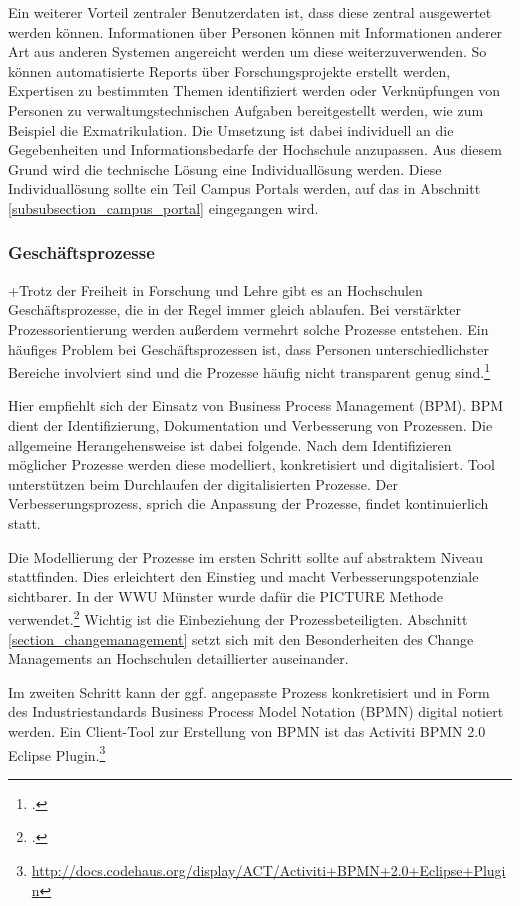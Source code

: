 Ein weiterer Vorteil zentraler Benutzerdaten ist, dass diese zentral ausgewertet werden können. Informationen über Personen können mit Informationen anderer Art aus anderen Systemen angereicht werden um diese weiterzuverwenden. So können automatisierte Reports über Forschungsprojekte erstellt werden, Expertisen zu bestimmten Themen identifiziert werden oder Verknüpfungen von Personen zu verwaltungstechnischen Aufgaben bereitgestellt werden, wie zum Beispiel die Exmatrikulation. Die Umsetzung ist dabei individuell an die Gegebenheiten und Informationsbedarfe der Hochschule anzupassen. Aus diesem Grund wird die technische Lösung eine Individuallösung werden. Diese Individuallösung sollte ein Teil Campus Portals werden, auf das in Abschnitt \ref{subsubsection_campus_portal} eingegangen wird. 

\subsubsection{Geschäftsprozesse}
+Trotz der Freiheit in Forschung und Lehre gibt es an Hochschulen Geschäftsprozesse, die in der Regel immer gleich ablaufen. Bei verstärkter Prozessorientierung werden außerdem vermehrt solche Prozesse entstehen. Ein häufiges Problem bei Geschäftsprozessen ist, dass Personen unterschiedlichster Bereiche involviert sind und die Prozesse häufig nicht transparent genug sind.\footcite[Vgl.][12]{becker_prozesse_2010}

Hier empfiehlt sich der Einsatz von Business Process Management (BPM). BPM dient der Identifizierung, Dokumentation und Verbesserung von Prozessen. Die allgemeine Herangehensweise ist dabei folgende. Nach dem Identifizieren möglicher Prozesse werden diese modelliert, konkretisiert und digitalisiert. Tool unterstützen beim Durchlaufen der digitalisierten Prozesse. Der Verbesserungsprozess, sprich die Anpassung der Prozesse, findet kontinuierlich statt.

Die Modellierung der Prozesse im ersten Schritt sollte auf abstraktem Niveau stattfinden. Dies erleichtert den Einstieg und macht Verbesserungspotenziale sichtbarer. In der WWU Münster wurde dafür die PICTURE Methode verwendet.\footcite[Vgl.][16]{becker_prozesse_2010} Wichtig ist die Einbeziehung der Prozessbeteiligten. Abschnitt \ref{section_changemanagement} setzt sich mit den Besonderheiten des Change Managements an Hochschulen detaillierter auseinander.

Im zweiten Schritt kann der ggf. angepasste Prozess konkretisiert und in Form des Industriestandards Business Process Model Notation (BPMN) digital notiert werden. Ein Client-Tool zur Erstellung von BPMN ist das Activiti BPMN 2.0 Eclipse Plugin.\footnote{\url{http://docs.codehaus.org/display/ACT/Activiti+BPMN+2.0+Eclipse+Plugin}}


